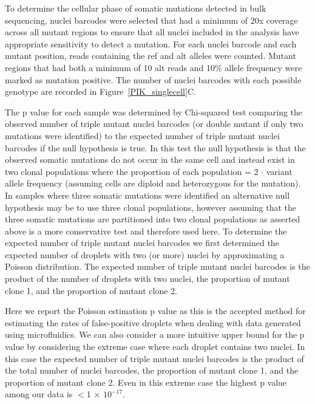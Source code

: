 To determine the cellular phase of somatic mutations detected in bulk sequencing, nuclei barcodes were selected that had a minimum of 20x coverage across all mutant regions to ensure that all nuclei included in the analysis have appropriate sensitivity to detect a mutation. For each nuclei barcode and each mutant position, reads containing the ref and alt alleles were counted. Mutant regions that had both a minimum of 10 alt reads and 10\% allele frequency were marked as mutation positive. The number of nuclei barcodes with each possible genotype are recorded in Figure~\ref{PIK_singlecell}C. 
	
The p value for each sample was determined by Chi-squared test comparing the observed number of triple mutant nuclei barcodes (or double mutant if only two mutations were identified) to the expected number of triple mutant nuclei barcodes if the null hypothesis is true. In this test the null hypothesis is that the observed somatic mutations do not occur in the same cell and instead exist in two clonal populations where the proportion of each population = 2 $\cdot$ variant allele frequency (assuming cells are diploid and heterozygous for the mutation). In samples where three somatic mutations were identified an alternative null hypothesis may be to use three clonal populations, however assuming that the three somatic mutations are partitioned into two clonal populations as asserted above is a more conservative test and therefore used here. To determine the expected number of triple mutant nuclei barcodes we first determined the expected number of droplets with two (or more) nuclei by approximating a Poisson distribution. The expected number of triple mutant nuclei barcodes is the product of the number of droplets with two nuclei, the proportion of mutant clone 1, and the proportion of mutant clone 2. 
	
Here we report the Poisson estimation p value as this is the accepted method for estimating the rates of false-positive droplets when dealing with data generated using microfluidics. We can also consider a more intuitive upper bound for the p value by considering the extreme case where each droplet contains two nuclei. In this case the expected number of triple mutant nuclei barcodes is the product of the total number of nuclei barcodes, the proportion of mutant clone 1, and the proportion of mutant clone 2. Even in this extreme case the highest p value among our data is $<$1 $\times$ $10^{-17}$. 

